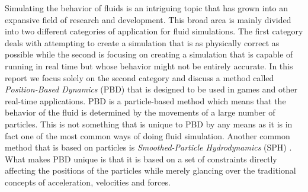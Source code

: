 Simulating the behavior of fluids is an intriguing topic that has grown into an
expansive field of research and development. This broad area is mainly divided
into two different categories of application for fluid simulations. The first
category deals with attempting to create a simulation that is as physically
correct as possible while the second is focusing on creating a simulation that
is capable of running in real time but whose behavior might not be entirely
accurate. In this report we focus solely on the second category and discuss a
method called \textit{Position-Based Dynamics} (PBD) \cite{muller2007position}
that is designed to be used in games and other real-time applications.
PBD is a particle-based method which means that the
behavior of the fluid is determined by the movements of a large number of
particles. This is not something that is unique to PBD by
any means as it is in fact one of the most common ways of doing fluid
simulation. Another common method that is based on particles is
\textit{Smoothed-Particle Hydrodynamics} (SPH) \cite{monaghan1992smoothed}.
What makes PBD unique is that it is based on a set of constraints directly
affecting the positions of the particles while merely glancing over the
traditional concepts of acceleration, velocities and forces.

